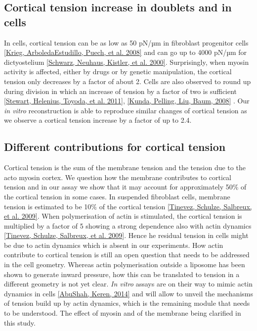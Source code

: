 \documentclass[A4paperpaper,11pt,english]{sphinxmanual}
\begin{document}
\subsection{Cortical tension increase in doublets and in cells}
\label{index-latex:cortical-tension-increase-in-doublets-and-in-cells}
In cells, cortical tension can be as low as 50 pN/µm in fibroblast progenitor
cells {\hyperref[index-latex:krieg2008]{{[}Krieg, ArboledaEstudillo, Puech,  et al.  2008{]}}} and can go up to 4000 pN/µm for
dictyostelium {\hyperref[index-latex:schwarz2000]{{[}Schwarz, Neuhaus, Kistler,  et al.  2000{]}}}. Surprisingly, when myosin activity is
affected, either by drugs or by genetic manipulation, the cortical tension only
decreases by a factor of about 2. Cells are also observed to round up during
division  in which an  increase of tension by a factor of two
is sufficient {\hyperref[index-latex:stewart2011]{{[}Stewart, Helenius, Toyoda,  et al.  2011{]}}}, {\hyperref[index-latex:kunda2008]{{[}Kunda, Pelling, Liu, Baum,  2008{]}}} .
Our \emph{in vitro} reconstruction is able to reproduce similar
changes of cortical tension as we observe a cortical tension increase by a factor of up to 2.4.


\subsection{Different contributions for cortical tension}
\label{index-latex:different-contributions-for-cortical-tension}
Cortical tension is the sum of the membrane tension and the tension due to the
acto myosin cortex. We question how the membrane contributes to cortical tension
and in our assay we show that it may account for approximately 50\% of the cortical tension in some cases.
In suspended fibroblast cells, membrane tension is estimated to be 10\% of the
cortical tension {\hyperref[index-latex:tinevez2009]{{[}Tinevez, Schulze, Salbreux,  et al.  2009{]}}}. When polymerisation of actin is
stimulated, the cortical tension is multiplied by a factor of 5 showing a
strong dependence also with actin dynamics {\hyperref[index-latex:tinevez2009]{{[}Tinevez, Schulze, Salbreux,  et al.  2009{]}}}. Hence he
residual tension in cells might be due to actin dynamics which is absent in our
experiments. How actin contribute to cortical tension is still an open question
that needs to be addressed in the cell geometry.  Whereas actin polymerisation
outside a liposome has been shown to generate inward pressure,
how this can be translated to tension  in a different geometry is
not yet clear. \emph{In vitro} assays are on their way to mimic actin dynamics in
cells {\hyperref[index-latex:abushah2014]{{[}AbuShah, Keren,  2014{]}}} and will allow to unveil the mechanisms of tension build up by
actin dynamics, which is the remaining module that needs to be understood. The
effect of myosin and of the membrane being clarified in this study.
\end{document}
